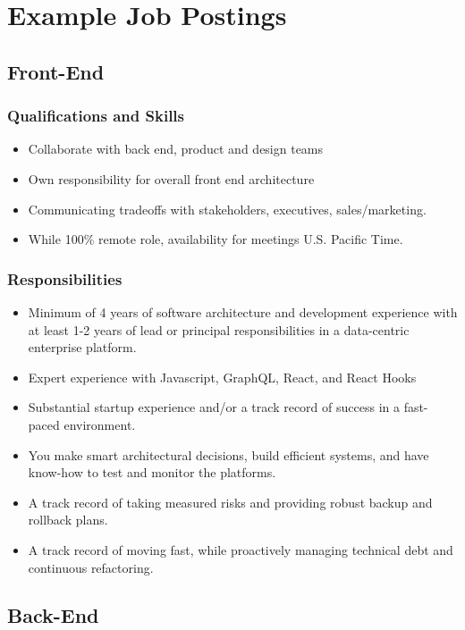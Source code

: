 \section{Example Job Postings}
\subsection*{Front-End}

\subsubsection{Qualifications and Skills} 
\begin{itemize}
    \item Collaborate with back end, product and design teams
    \item Own responsibility for overall front end architecture
    \item Communicating tradeoffs with stakeholders, executives, sales/marketing. 
    \item While 100\% remote role, availability for meetings U.S. Pacific Time.
\end{itemize}

\subsubsection{Responsibilities}
\begin{itemize}
    \item Minimum of 4 years of software architecture and development experience with at least 1-2 years of lead or principal responsibilities in a data-centric enterprise platform.
    \item Expert experience with Javascript, GraphQL, React, and React Hooks
    \item Substantial startup experience and/or a track record of success in a fast-paced environment.
    \item You make smart architectural decisions, build efficient systems, and have know-how to test and monitor the platforms.
    \item A track record of taking measured risks and providing robust backup and rollback plans.
    \item A track record of moving fast, while proactively managing technical debt and continuous refactoring.
\end{itemize}


\subsection*{Back-End}
